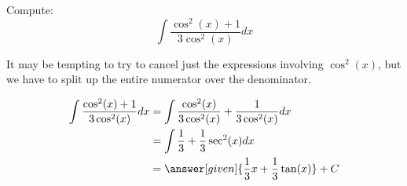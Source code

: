 \documentclass[nooutcomes]{ximera}
\begin{document}
\begin{example}
  Compute:
  \[
  \int \frac{\cos^2(x)+1}{3 \cos^2(x)} dx
  \]
 
  \begin{explanation}
It may be tempting to try to cancel just the expressions involving $\cos^2(x)$, but we have to split up the entire numerator over the denominator.

    \begin{align*}
    \int \frac{\cos^2(x)+1}{3 \cos^2(x)} dx &=  \int \frac{\cos^2(x)}{3 \cos^2(x)} +  \frac{1}{3 \cos^2(x)} dx \\
    &= \int \frac{1}{3} + \frac{1}{3} \sec^2(x) dx \\
    & = \answer[given]{\frac{1}{3}x+\frac{1}{3}\tan(x)}+C 
    \end{align*}
      
  \end{explanation}
\end{example}
\end{document}
